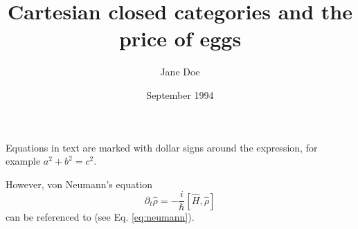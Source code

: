\documentclass{article}
\title{Cartesian closed categories
  and the price of eggs}
\author{Jane Doe}
\date{September 1994}
\begin{document}
\huge
Equations in text are marked with dollar
signs around the expression, for example
$a^2 + b^2 = c^2$.

However, von Neumann's equation
\begin{equation}
  \label{eq:neumann}
  \partial_t \hat \rho = -\frac{i}{\hbar}
  \left[ \hat H, \hat \rho \right]
\end{equation}
can be referenced to (see Eq. \ref{eq:neumann}).
\end{document}
